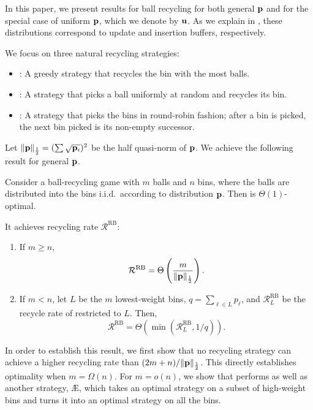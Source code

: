 In this paper, we present results for ball recycling for both general $\mathbf{p}$ and
for the special case of uniform $\mathbf{p}$, which we denote by $\mathbf{u}$.  As we explain
in , these distributions correspond to update and
insertion buffers, respectively.

We focus on three natural recycling strategies:
\begin{itemize}
\item \FB: A greedy strategy that recycles the bin with the most balls.
\item \RB: A strategy that picks a ball uniformly at random and recycles its
	bin.
\item \GG: A strategy that picks the bins in round-robin fashion; after a bin
	is picked, the next bin picked is its non-empty successor.
\end{itemize}
Let $\|\mathbf{p}\|_{\frac{1}{2}} = (\sum \sqrt{\mathbf{p}_i})^2$  be the half quasi-norm of $\mathbf{p}$.  We
achieve the following result for general $\mathbf{p}$.

\begin{theorem}\label{thm:random-opt}
	Consider a ball-recycling game with $m$ balls and $n$ bins, where the balls
	are distributed into the bins i.i.d.\ according to distribution $\mathbf{p}$. Then
	\RB{} is $\Theta(1)$-optimal.

        It achieves recycling rate
	$\mathcal{R}^\textrm{RB}$:
	\begin{enumerate}
		\item If $m \geq n$,
			\[\mathcal{R}^\textrm{RB} = \Theta\left(\frac{m}{\|\mathbf{p}\|_{\frac{1}{2}}}\right).\]
		\item If $m < n$, let $L$ be the $m$ lowest-weight bins, $q = \sum_{\ell\in
			L} p_\ell$, and $\mathcal{R}_L^\textrm{RB}$ be the recycle rate of
			\RB restricted to $L$. Then,
			\[\mathcal{R}^\textrm{RB} =
			\Theta\left(\min\left(\mathcal{R}_L^\textrm{RB}, 1/q\right)\right).\]
	\end{enumerate}
\end{theorem}

In order to establish this result, we first show that no recycling strategy can
achieve a higher recycling rate than $(2m+n)/\|\mathbf{p}\|_{\frac{1}{2}}$.  This directly
establishes optimality when $m = \Omega(n)$. For $m=o(n)$, we show that \RB
performs as well as another strategy, \AE, which takes an optimal strategy on a
subset of high-weight bins and turns it into an optimal strategy on all the
bins.

